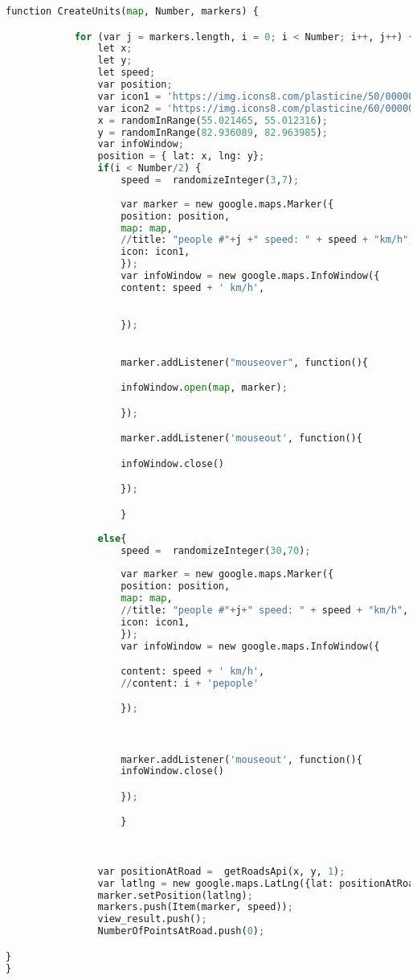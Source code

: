 \documentclass[a4paper]{article}
\begin{document}
\begin{lstlisting}[language=python,tabsize = 1,breaklines=true, breakatwhitespace=false,frame=single]
		function CreateUnits(map, Number, markers) {

			for (var j = markers.length, i = 0; i < Number; i++, j++) {
				let x;	
        		let y; 		
        		let speed;	
				var position;	
				var icon1 = 'https://img.icons8.com/plasticine/50/000000/arms-up.png';
				var icon2 = 'https://img.icons8.com/plasticine/60/000000/person-laying-down.png'
				x = randomInRange(55.021465, 55.012316); 
				y = randomInRange(82.936089, 82.963985); 
				var infoWindow;
				position = { lat: x, lng: y}; 
				if(i < Number/2) {
					speed =  randomizeInteger(3,7);
					
					var marker = new google.maps.Marker({
					position: position,
					map: map,
					//title: "people #"+j +" speed: " + speed + "km/h",
					icon: icon1,
					});
					var infoWindow = new google.maps.InfoWindow({
					content: speed + ' km/h',
					

					}); 
					 

					marker.addListener("mouseover", function(){ 

					infoWindow.open(map, marker);

					});

					marker.addListener('mouseout', function(){ 

					infoWindow.close()

					});

					}
				
				else{
					speed =  randomizeInteger(30,70);
					
					var marker = new google.maps.Marker({
					position: position,
					map: map,
					//title: "people #"+j+" speed: " + speed + "km/h",
					icon: icon1,
					});
					var infoWindow = new google.maps.InfoWindow({ 

					content: speed + ' km/h',
					//content: i + 'pepople'

					});

					

					marker.addListener('mouseout', function(){
					infoWindow.close()

					});

					}
				

				
				var positionAtRoad =  getRoadsApi(x, y, 1);
				var latlng = new google.maps.LatLng({lat: positionAtRoad[0], lng: positionAtRoad[1]});
				marker.setPosition(latlng);
				markers.push(Item(marker, speed));	
				view_result.push();
				NumberOfPointsAtRoad.push(0);

}
}


\end{lstlisting}
\end{document}
